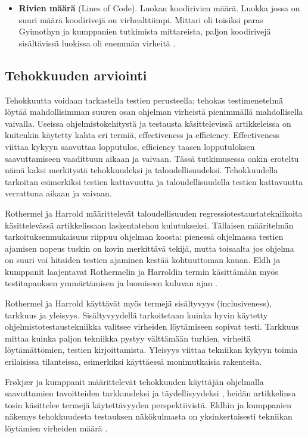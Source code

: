 \documentclass[finnish]{tktltiki2}
\theoremstyle{definition}
\theoremstyle{remark}
\begin{document}
\begin{itemize}
  \item \textbf{Rivien määrä} (Lines of Code). Luokan koodirivien määrä.  Luokka jossa on suuri määrä koodirivejä on virhealttiimpi. Mittari oli toisiksi paras Gyimothyn ja kumppanien tutkimista mittareista, paljon koodirivejä sisältävissä luokissa oli enemmän virheitä \cite{Gyimothy05}.


\end{itemize}





\subsection{Tehokkuuden arviointi}

Tehokkuutta voidaan tarkastella testien perusteella; tehokas testimenetelmä löytää mahdollisimman suuren osan ohjelman virheistä pienimmällä mahdollisella vaivalla. Useissa ohjelmistokehitystä ja testausta käsittelevissä artikkeleissa on kuitenkin käytetty kahta eri termiä, effectiveness ja efficiency.  Effectiveness viittaa kykyyn saavuttaa lopputulos, efficiency taasen lopputuloksen saavuttamiseen vaadittuun aikaan ja vaivaan. Tässä tutkimusessa onkin eroteltu nämä kaksi merkitystä tehokkuudeksi ja taloudellisuudeksi. Tehokkuudella tarkoitan esimerkiksi testien kattavuutta ja taloudellisuudella testien kattavuutta verrattuna aikaan ja vaivaan.

Rothermel ja Harrold määrittelevät taloudellisuuden regressiotestaustatekniikoita käsittelevässä artikkelissaan \cite{Rothermel96} laskentatehon kulutukseksi. Tällaisen määritelmän tarkoituksenmukaisuus riippuu ohjelman koosta: pienessä ohjelmassa testien ajamisen nopeus tuskin on kovin merkittävä tekijä, mutta toisaalta jos ohjelma on suuri voi hitaiden testien ajaminen kestää kohtuuttoman kauan. Eldh ja kumppanit laajentavat Rothermelin ja Harroldin termin käsittämään myös testitapauksen ymmärtämisen ja luomiseen kuluvan ajan \cite{Eldh06}.

Rothermel ja Harrold käyttävät myös termejä sisältyvyys (inclusiveness), tarkkuus ja yleisyys. Sisältyvyydellä  tarkoitetaan kuinka hyvin käytetty ohjelmistotestaustekniikka valitsee virheiden löytämiseen sopivat testi. Tarkkuus mittaa kuinka paljon tekniikka pystyy välttämään turhien, virheitä löytämättömien, testien kirjoittamista. Yleisyys viittaa tekniikan kykyyn toimia erilaisissa tilanteissa, esimerkiksi käyttäessä monimutkaisia rakenteita.\cite{Rothermel96}

Frøkjær ja kumppanit \cite{Frokjaer00} määrittelevät tehokkuuden käyttäjän ohjelmalla saavuttamien tavoitteiden tarkkuudeksi ja täydellisyydeksi , heidän artikkelinsa tosin käsittelee termejä käytettävyyden perspektiivistä. Eldhin ja kumppanien näkemys tehokkuudesta testauksen näkökulmasta on yksinkertaisesti tekniikan löytämien virheiden määrä \cite{Eldh06}.
\end{document}
